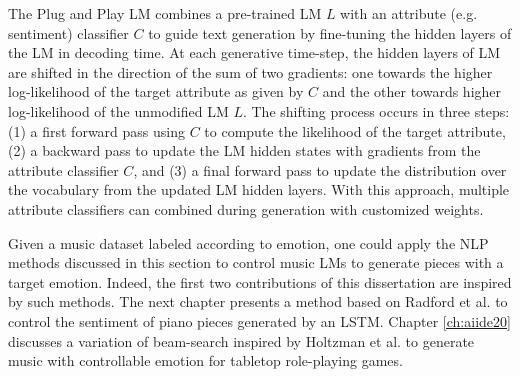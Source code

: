 The Plug and Play LM \cite{dathathri2019plug} combines a pre-trained LM $L$ with an attribute (e.g. sentiment) classifier $C$ to guide text generation by fine-tuning the hidden layers of the LM in decoding time. At each generative time-step, the hidden layers of LM are shifted in the direction of the sum of two gradients: one towards the higher log-likelihood of the target attribute as given by $C$ and the other towards higher log-likelihood of the unmodified LM $L$. The shifting process occurs in three steps: (1) a first forward pass using $C$ to compute the likelihood of the target attribute, (2) a backward pass to update the LM hidden states with gradients from the attribute classifier $C$, and (3) a final forward pass to update the distribution over the vocabulary from the updated LM hidden layers. With this approach, multiple attribute classifiers can combined during generation with customized weights.


Given a music dataset labeled according to emotion, one could apply the NLP methods discussed in this section to control music LMs to generate pieces with a target emotion. Indeed, the first two contributions of this dissertation are inspired by such methods. The next chapter presents a method based on Radford et al. \cite{radford_2017} to control the sentiment of piano pieces generated by an LSTM. Chapter \ref{ch:aiide20} discusses a variation of beam-search inspired by Holtzman et al. \cite{holtzman2018learning} to generate music with controllable emotion for tabletop role-playing games.

